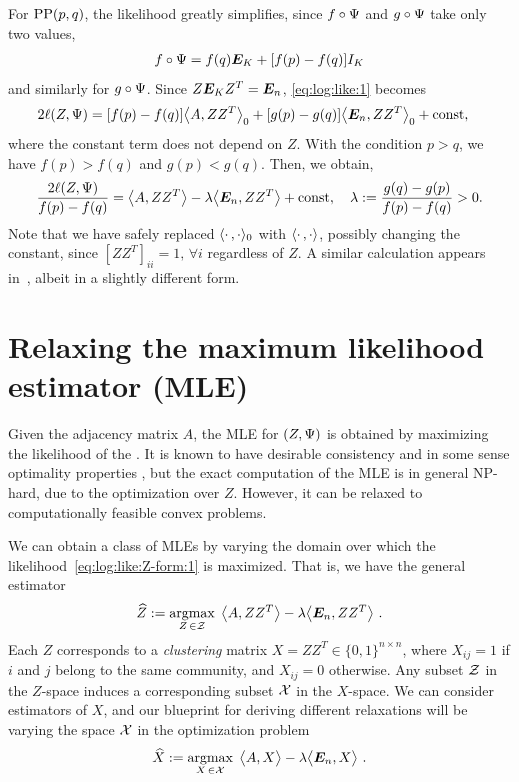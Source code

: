 For $\text{PP}(p,q)$, the likelihood greatly simplifies, since $f \circ \Psi$
and $g \circ \Psi$ take only two values, 
\begin{align*}
  f\circ \Psi = f(q) \bm{E}_K + [f(p) - f(q)] I_K 
\end{align*}
and similarly for $g \circ \Psi$.  Since $Z \bm{E}_K Z^T = \bm{E}_n$, 
\eqref{eq:log:like:1} becomes 
\begin{align*}
  2\ell(Z,\Psi)  &= [f(p) - f(q)] \big\langle A, ZZ^T \big\rangle_0 + [g(p) - g(q)] \big\langle \bm{E}_n, ZZ^T \big\rangle_0 + \text{const} ,
\end{align*}
where the constant term does not depend on $Z$. With the condition $p > q$, we have $f(p) > f(q)$ and $g(p) < g(q)$. Then, we obtain,
\begin{align}\label{eq:log:like:Z-form:1}
  \frac{2\ell(Z,\Psi)}{f(p) - f(q)} =
   \big\langle A, ZZ^T \big\rangle - \lambda  \big\langle \bm{E}_n, ZZ^T \big\rangle + \text{const}, \quad 
    \lambda := \frac{g(q) - g(p)}{f(p) - f(q)} > 0.
\end{align}
Note that we have safely replaced $\langle \cdot\,,\cdot\rangle_0$ with $\langle \cdot\,,\cdot\rangle$, possibly changing the constant, since $[ZZ^T]_{ii} = 1, \, \forall i$ regardless of $Z$. A similar calculation appears in~\cite{Cai2014}, albeit in a slightly different form.







% 
\section{Relaxing the maximum likelihood estimator (MLE)}\label{sec:MLE:relax}
Given the adjacency matrix $A$,  the MLE for $(Z,\Psi)$ is obtained by
maximizing the likelihood of the \SBM.   It is known to have desirable
consistency and in some sense optimality properties
\cite{Bickel&Chen2009}, but the exact computation of the MLE is in
general NP-hard, due to the optimization over $Z$. However, it can
be relaxed to computationally feasible convex problems.

We can obtain a class of MLEs by varying the domain over which the
likelihood~\eqref{eq:log:like:Z-form:1} is maximized. %
That is, we have the general estimator 
\begin{align}\label{eq:gen:optim:Zspace}
	\widehat{Z} := \operatorname*{argmax}_{Z\, \in \mathcal{Z}} \; \big\langle A, ZZ^T \big\rangle -
        \lambda  \big\langle \bm{E}_n, ZZ^T \big\rangle \ . 
\end{align}
Each $Z$ corresponds to a \emph{clustering} matrix $X = ZZ^T \in
\{0,1\}^{n \times n}$, where $X_{ij} = 1$ if $i$ and $j$ belong to the
same community, and $X_{ij}=0$ otherwise. Any subset $\mathcal{Z}$ in the
$Z$-space induces a corresponding subset $\mathcal{X}$ in the $X$-space. We
can consider estimators of $X$, and our blueprint for
deriving different relaxations will be varying the space $\mathcal{X}$ in the
optimization problem  
\begin{align}\label{eq:gen:optim:Xspace}
	\widehat{X} := \operatorname*{argmax}_{X\, \in \mathcal{X}} \; \big\langle A, X \big\rangle 
	- \lambda  \big\langle \bm{E}_n, X \big\rangle \ .
\end{align}


